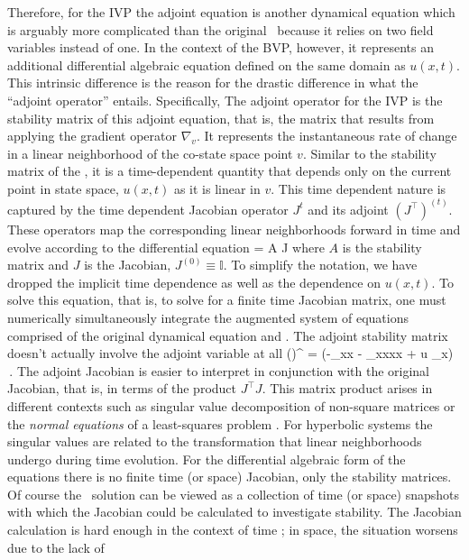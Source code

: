Therefore, for the IVP the adjoint equation is another dynamical equation which is arguably
more complicated than the original \KSe\ because it relies on two field variables instead
of one. In the context of the BVP, however, it represents an additional differential algebraic
equation defined on the same domain as $u(x,t)$. This intrinsic difference is the reason
for the drastic difference in what the ``adjoint operator'' entails. Specifically,
The adjoint operator for the IVP is the stability matrix  of this adjoint
equation, that is, the matrix that results from applying the
gradient operator $\nabla_v$.
It represents the instantaneous rate of change in a linear neighborhood
of the co-state space point $v$.  Similar to the stability matrix of the
\KSe, it is a time-dependent quantity that depends only on the current point in
state space, $u(x,t)$ as it is linear in $v$. This time dependent nature is
captured by the time dependent Jacobian operator $J^t$ and its adjoint $(J^{\top})^(t)$.
These operators map the corresponding linear neighborhoods forward in time
and evolve according to the differential equation
\beq \label{jacobiandot}
 = A J
\eeq
where $A$ is the stability matrix and $J$ is the Jacobian, $J^(0) \equiv \mathbb{I}$.
To simplify the notation, we have dropped the implicit time dependence as well as the
dependence on $u(x,t)$. To solve this equation, that is, to solve for a finite time Jacobian
matrix, one must numerically simultaneously integrate the augmented system of equations comprised
of the original dynamical equation and . The adjoint stability matrix
doesn't actually involve the adjoint variable at all
\beq \label{adjstab}
()^{\top} = (-\partial_{xx} - \partial_{xxxx} + u \partial_x) \,.
\eeq
The adjoint Jacobian is easier to interpret in conjunction with the original Jacobian,
that is, in terms of the product $J^{\top}J$. This matrix product
arises in different contexts such as singular value decomposition of non-square
matrices or the \textit{normal equations} of a least-squares problem .
For hyperbolic systems the singular values are related to the transformation that
linear neighborhoods undergo during time evolution.
For the differential algebraic form of the equations there is no finite time (or space)
Jacobian, only the stability matrices.
Of course the \spt\ solution can
be viewed as a collection of time (or space) snapshots with which the Jacobian could
be calculated to investigate stability. The Jacobian calculation is hard enough in the
context of time ; in space, the situation worsens due to the lack of

